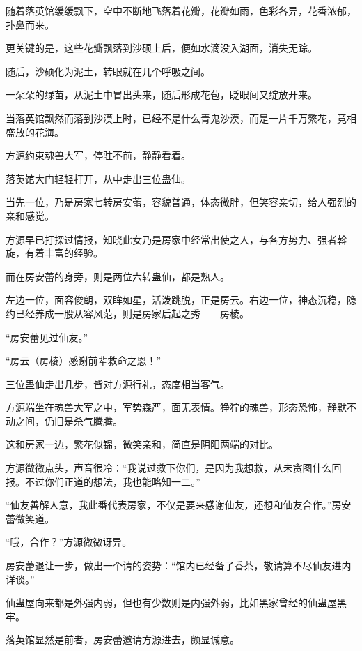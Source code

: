 
\begin{this_body}

随着落英馆缓缓飘下，空中不断地飞落着花瓣，花瓣如雨，色彩各异，花香浓郁，扑鼻而来。

更关键的是，这些花瓣飘落到沙硕上后，便如水滴没入湖面，消失无踪。

随后，沙硕化为泥土，转眼就在几个呼吸之间。

一朵朵的绿苗，从泥土中冒出头来，随后形成花苞，眨眼间又绽放开来。

当落英馆飘然而落到沙漠上时，已经不是什么青鬼沙漠，而是一片千万繁花，竞相盛放的花海。

方源约束魂兽大军，停驻不前，静静看着。

落英馆大门轻轻打开，从中走出三位蛊仙。

当先一位，乃是房家七转房安蕾，容貌普通，体态微胖，但笑容亲切，给人强烈的亲和感觉。

方源早已打探过情报，知晓此女乃是房家中经常出使之人，与各方势力、强者斡旋，有着丰富的经验。

而在房安蕾的身旁，则是两位六转蛊仙，都是熟人。

左边一位，面容俊朗，双眸如星，活泼跳脱，正是房云。右边一位，神态沉稳，隐约已经养成一股从容风范，则是房家后起之秀——房棱。

“房安蕾见过仙友。”

“房云（房棱）感谢前辈救命之恩！”

三位蛊仙走出几步，皆对方源行礼，态度相当客气。

方源端坐在魂兽大军之中，军势森严，面无表情。狰狞的魂兽，形态恐怖，静默不动之间，仍旧是杀气腾腾。

这和房家一边，繁花似锦，微笑亲和，简直是阴阳两端的对比。

方源微微点头，声音很冷：“我说过救下你们，是因为我想救，从未贪图什么回报。不过你们正道的想法，我也能略知一二。”

“仙友善解人意，我此番代表房家，不仅是要来感谢仙友，还想和仙友合作。”房安蕾微笑道。

“哦，合作？”方源微微讶异。

房安蕾退让一步，做出一个请的姿势：“馆内已经备了香茶，敬请算不尽仙友进内详谈。”

仙蛊屋向来都是外强内弱，但也有少数则是内强外弱，比如黑家曾经的仙蛊屋黑牢。

落英馆显然是前者，房安蕾邀请方源进去，颇显诚意。


\end{this_body}
